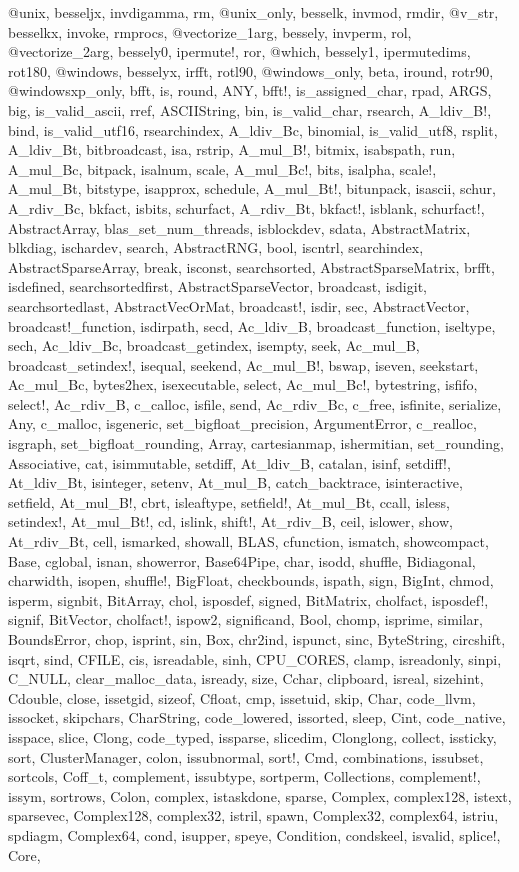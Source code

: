@unix, besseljx, invdigamma, rm, @unix_only, besselk, invmod, rmdir, @v_str, besselkx, invoke, rmprocs, @vectorize_1arg, bessely, invperm, rol, @vectorize_2arg, bessely0, ipermute!, ror, @which, bessely1, ipermutedims, rot180, @windows, besselyx, irfft, rotl90, @windows_only, beta, iround, rotr90, @windowsxp_only, bfft, is, round, ANY, bfft!, is_assigned_char, rpad, ARGS, big, is_valid_ascii, rref, ASCIIString, bin, is_valid_char, rsearch, A_ldiv_B!, bind, is_valid_utf16, rsearchindex, A_ldiv_Bc, binomial, is_valid_utf8, rsplit, A_ldiv_Bt, bitbroadcast, isa, rstrip, A_mul_B!, bitmix, isabspath, run, A_mul_Bc, bitpack, isalnum, scale, A_mul_Bc!, bits, isalpha, scale!, A_mul_Bt, bitstype, isapprox, schedule, A_mul_Bt!, bitunpack, isascii, schur, A_rdiv_Bc, bkfact, isbits, schurfact, A_rdiv_Bt, bkfact!, isblank, schurfact!, AbstractArray, blas_set_num_threads, isblockdev, sdata, AbstractMatrix, blkdiag, ischardev, search, AbstractRNG, bool, iscntrl, searchindex, AbstractSparseArray, break, isconst, searchsorted, AbstractSparseMatrix, brfft, isdefined, searchsortedfirst, AbstractSparseVector, broadcast, isdigit, searchsortedlast, AbstractVecOrMat, broadcast!, isdir, sec, AbstractVector, broadcast!_function, isdirpath, secd, Ac_ldiv_B, broadcast_function, iseltype, sech, Ac_ldiv_Bc, broadcast_getindex, isempty, seek, Ac_mul_B, broadcast_setindex!, isequal, seekend, Ac_mul_B!, bswap, iseven, seekstart, Ac_mul_Bc, bytes2hex, isexecutable, select, Ac_mul_Bc!, bytestring, isfifo, select!, Ac_rdiv_B, c_calloc, isfile, send, Ac_rdiv_Bc, c_free, isfinite, serialize, Any, c_malloc, isgeneric, set_bigfloat_precision, ArgumentError, c_realloc, isgraph, set_bigfloat_rounding, Array, cartesianmap, ishermitian, set_rounding, Associative, cat, isimmutable, setdiff, At_ldiv_B, catalan, isinf, setdiff!, At_ldiv_Bt, isinteger, setenv, At_mul_B, catch_backtrace, isinteractive, setfield, At_mul_B!, cbrt, isleaftype, setfield!, At_mul_Bt, ccall, isless, setindex!, At_mul_Bt!, cd, islink, shift!, At_rdiv_B, ceil, islower, show, At_rdiv_Bt, cell, ismarked, showall, BLAS, cfunction, ismatch, showcompact, Base, cglobal, isnan, showerror, Base64Pipe, char, isodd, shuffle, Bidiagonal, charwidth, isopen, shuffle!, BigFloat, checkbounds, ispath, sign, BigInt, chmod, isperm, signbit, BitArray, chol, isposdef, signed, BitMatrix, cholfact, isposdef!, signif, BitVector, cholfact!, ispow2, significand, Bool, chomp, isprime, similar, BoundsError, chop, isprint, sin, Box, chr2ind, ispunct, sinc, ByteString, circshift, isqrt, sind, CFILE, cis, isreadable, sinh, CPU_CORES, clamp, isreadonly, sinpi, C_NULL, clear_malloc_data, isready, size, Cchar, clipboard, isreal, sizehint, Cdouble, close, issetgid, sizeof, Cfloat, cmp, issetuid, skip, Char, code_llvm, issocket, skipchars, CharString, code_lowered, issorted, sleep, Cint, code_native, isspace, slice, Clong, code_typed, issparse, slicedim, Clonglong, collect, issticky, sort, ClusterManager, colon, issubnormal, sort!, Cmd, combinations, issubset, sortcols, Coff_t, complement, issubtype, sortperm, Collections, complement!, issym, sortrows, Colon, complex, istaskdone, sparse, Complex, complex128, istext, sparsevec, Complex128, complex32, istril, spawn, Complex32, complex64, istriu, spdiagm, Complex64, cond, isupper, speye, Condition, condskeel, isvalid, splice!, Core, 